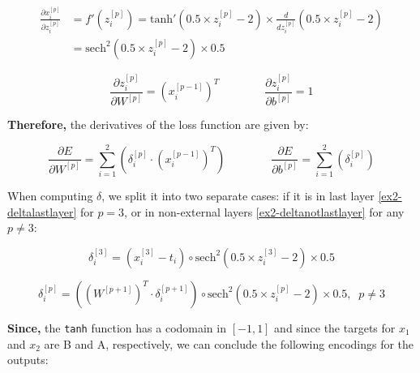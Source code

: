 \documentclass[12pt]{article}
\begin{document}
\begin{enumerate}[leftmargin=\labelsep]
        \vskip -0.5cm
        \begin{align*}
          \frac{\partial x^{[p]}_i}{\partial z^{[p]}_i} & = f'\left(z^{[p]}_i\right) = \text{tanh}'\left(0.5 \times z^{[p]}_i - 2\right) \times
          \frac{d}{d z^{[p]}_i} \left(0.5 \times z^{[p]}_i - 2\right)                                                                           \\
                                                        & = \text{sech}^2\left(0.5 \times z^{[p]}_i - 2\right) \times 0.5
        \end{align*}

        \begin{equation*}
          \frac{\partial z^{[p]}_i}{\partial W^{[p]}} = \left(x^{[p-1]}_i\right)^{T} \qquad\qquad
          \frac{\partial z^{[p]}_i}{\partial b^{[p]}} = 1
        \end{equation*}

        \textbf{Therefore,} the derivatives of the loss function are given by:

        \begin{equation}\label{ex2-derivate-loss-smiplified}
          \frac{\partial E}{\partial W^{[p]}} = \sum_{i=1}^{2} \left(\delta^{[p]}_i \cdot \left(x^{[p-1]}_i\right)^{T} \right) \qquad\qquad
          \frac{\partial E}{\partial b^{[p]}} = \sum_{i=1}^{2} \left(\delta^{[p]}_i\right)
        \end{equation}

        When computing \(\delta\), we split it into two separate cases: if it is in  last layer \eqref{ex2-deltalastlayer} for $p = 3$, or in non-external
        layers \eqref{ex2-deltanotlastlayer} for any $p \neq 3$:

        \begin{equation}\label{ex2-deltalastlayer}
          \delta^{[3]}_i = \left(x^{[3]}_i - t_i\right) \circ \text{sech}^{2}\left(0.5 \times z^{[3]}_i - 2\right) \times 0.5
        \end{equation}

        \begin{equation}\label{ex2-deltanotlastlayer}
          \delta^{[p]}_i = \left(\left(W^{[p+1]}\right)^{T} \cdot \delta^{[p+1]}_i\right) \circ \text{sech}^{2}\left(0.5 \times z^{[p]}_i - 2\right) \times 0.5, \;\; p \neq 3
        \end{equation}

        \textbf{Since,} the \texttt{tanh} function has a codomain in $[-1,1]$ and since the targets for $x_1$ and $x_2$ are B and A, respectively, we can
        conclude the following encodings for the outputs:


\end{enumerate}
\end{document}
